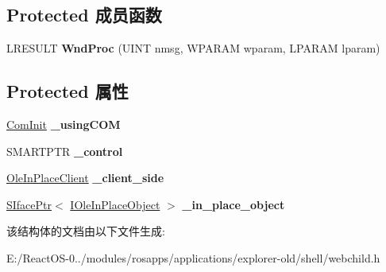 \subsection*{Protected 成员函数}
\begin{DoxyCompactItemize}
\item 
\mbox{\label{struct_i_p_ctrl_window_a4b91c0a0d29f0281766b7e714d702ea7}} 
L\+R\+E\+S\+U\+LT {\bfseries Wnd\+Proc} (U\+I\+NT nmsg, W\+P\+A\+R\+AM wparam, L\+P\+A\+R\+AM lparam)
\end{DoxyCompactItemize}
\subsection*{Protected 属性}
\begin{DoxyCompactItemize}
\item 
\mbox{\label{struct_i_p_ctrl_window_ab0bfaad6d5739d3723458957b610e876}} 
\hyperlink{struct_com_init}{Com\+Init} {\bfseries \+\_\+using\+C\+OM}
\item 
\mbox{\label{struct_i_p_ctrl_window_a517e4d1cd1642abbd674501a55906a34}} 
S\+M\+A\+R\+T\+P\+TR {\bfseries \+\_\+control}
\item 
\mbox{\label{struct_i_p_ctrl_window_a40e9d50b8cc851917f4d108af99b264f}} 
\hyperlink{struct_ole_in_place_client}{Ole\+In\+Place\+Client} {\bfseries \+\_\+client\+\_\+side}
\item 
\mbox{\label{struct_i_p_ctrl_window_abd1f08d58a9548a2495a01258bee3a83}} 
\hyperlink{struct_s_iface_ptr}{S\+Iface\+Ptr}$<$ \hyperlink{interface_i_ole_in_place_object}{I\+Ole\+In\+Place\+Object} $>$ {\bfseries \+\_\+in\+\_\+place\+\_\+object}
\end{DoxyCompactItemize}


该结构体的文档由以下文件生成\+:\begin{DoxyCompactItemize}
\item 
E\+:/\+React\+O\+S-\/0../modules/rosapps/applications/explorer-\/old/shell/webchild.\+h\end{DoxyCompactItemize}
